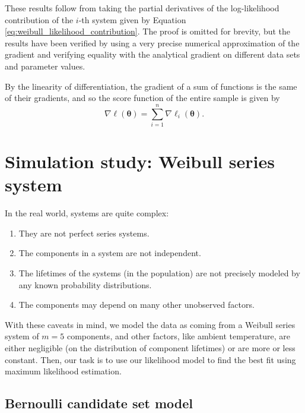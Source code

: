 \documentclass[
]{article}
\begin{document}
These results follow from taking the partial derivatives of the
log-likelihood contribution of the \(i\)-th system given by Equation
\eqref{eq:weibull_likelihood_contribution}. The proof is omitted for
brevity, but the results have been verified by using a very precise
numerical approximation of the gradient and verifying equality with the
analytical gradient on different data sets and parameter values.

By the linearity of differentiation, the gradient of a sum of functions
is the same of their gradients, and so the score function of the entire
sample is given by \begin{equation}
\label{eq:weibull_series_score}
\nabla \ell(\boldsymbol{\theta}) = \sum_{i=1}^n \nabla \ell_i(\boldsymbol{\theta}).
\end{equation}

\hypertarget{simulation-study-weibull-series-system}{%
\section{Simulation study: Weibull series
system}\label{simulation-study-weibull-series-system}}

In the real world, systems are quite complex:

\begin{enumerate}
\def\labelenumi{\arabic{enumi}.}
\item
  They are not perfect series systems.
\item
  The components in a system are not independent.
\item
  The lifetimes of the systems (in the population) are not precisely
  modeled by any known probability distributions.
\item
  The components may depend on many other unobserved factors.
\end{enumerate}

With these caveats in mind, we model the data as coming from a Weibull
series system of \(m = 5\) components, and other factors, like ambient
temperature, are either negligible (on the distribution of component
lifetimes) or are more or less constant. Then, our task is to use our
likelihood model to find the best fit using maximum likelihood
estimation.

\hypertarget{bernoulli-candidate-set-model}{%
\subsection{Bernoulli candidate set
model}\label{bernoulli-candidate-set-model}}
\end{document}
